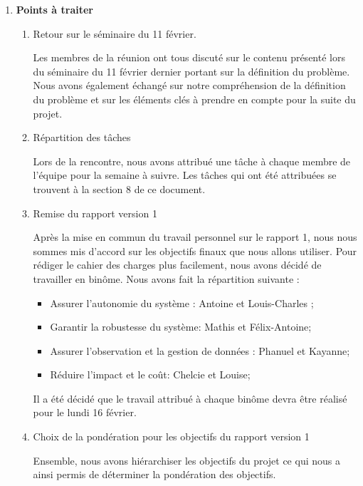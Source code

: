 \documentclass[12pt]{ULojpv}
\begin{document}
\begin{enumerate}

\item \textbf{Points à traiter}

\begin{enumerate}

\item Retour sur le séminaire du 11 février.

Les membres de la réunion ont tous discuté sur le contenu présenté
lors du séminaire du 11 février dernier portant sur la définition du problème. Nous avons également échangé sur notre compréhension de la définition du problème et sur les éléments clés à prendre en compte pour la suite du projet.

\item Répartition des tâches

Lors de la rencontre, nous avons attribué une tâche à chaque membre de l'équipe pour la semaine à suivre. Les tâches
qui ont été attribuées se trouvent à la section 8 de ce document.

\item Remise du rapport version 1

Après la mise en commun du travail personnel sur le rapport 1, nous nous sommes mis d'accord sur les objectifs finaux que nous allons utiliser. Pour rédiger le cahier des charges plus facilement, nous avons décidé de travailler en binôme. Nous avons fait la répartition suivante :
   \begin{itemize}
   \item  Assurer l'autonomie du système : Antoine et Louis-Charles ;
   \item  Garantir la robustesse du système: Mathis et Félix-Antoine;
   \item  Assurer l'observation et la gestion de données : Phanuel et Kayanne;
   \item Réduire l'impact et le coût: Chelcie et Louise;
\end{itemize} 
Il a été décidé que le travail attribué à chaque binôme devra être réalisé pour le lundi 16 février.

\item Choix de la pondération pour les objectifs du rapport version 1

Ensemble, nous avons hiérarchiser les objectifs du projet ce qui nous a ainsi permis de déterminer la pondération des objectifs.



\end{enumerate}
\end{enumerate}
\end{document}
